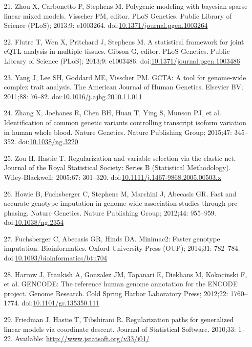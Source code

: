 \documentclass[]{article}
\begin{document}
21. Zhou X, Carbonetto P, Stephens M. Polygenic modeling with bayesian
sparse linear mixed models. Visscher PM, editor. PLoS Genetics. Public
Library of Science (PLoS); 2013;9: e1003264.
doi:\href{http://dx.doi.org/10.1371/journal.pgen.1003264}{10.1371/journal.pgen.1003264}

22. Flutre T, Wen X, Pritchard J, Stephens M. A statistical framework
for joint eQTL analysis in multiple tissues. Gibson G, editor. PLoS
Genetics. Public Library of Science (PLoS); 2013;9: e1003486.
doi:\href{http://dx.doi.org/10.1371/journal.pgen.1003486}{10.1371/journal.pgen.1003486}

23. Yang J, Lee SH, Goddard ME, Visscher PM. GCTA: A tool for
genome-wide complex trait analysis. The American Journal of Human
Genetics. Elsevier BV; 2011;88: 76--82.
doi:\href{http://dx.doi.org/10.1016/j.ajhg.2010.11.011}{10.1016/j.ajhg.2010.11.011}

24. Zhang X, Joehanes R, Chen BH, Huan T, Ying S, Munson PJ, et al.
Identification of common genetic variants controlling transcript isoform
variation in human whole blood. Nature Genetics. Nature Publishing
Group; 2015;47: 345--352.
doi:\href{http://dx.doi.org/10.1038/ng.3220}{10.1038/ng.3220}

25. Zou H, Hastie T. Regularization and variable selection via the
elastic net. Journal of the Royal Statistical Society: Series B
(Statistical Methodology). Wiley-Blackwell; 2005;67: 301--320.
doi:\href{http://dx.doi.org/10.1111/j.1467-9868.2005.00503.x}{10.1111/j.1467-9868.2005.00503.x}

26. Howie B, Fuchsberger C, Stephens M, Marchini J, Abecasis GR. Fast
and accurate genotype imputation in genome-wide association studies
through pre-phasing. Nature Genetics. Nature Publishing Group; 2012;44:
955--959. doi:\href{http://dx.doi.org/10.1038/ng.2354}{10.1038/ng.2354}

27. Fuchsberger C, Abecasis GR, Hinds DA. Minimac2: Faster genotype
imputation. Bioinformatics. Oxford University Press (OUP); 2014;31:
782--784.
doi:\href{http://dx.doi.org/10.1093/bioinformatics/btu704}{10.1093/bioinformatics/btu704}

28. Harrow J, Frankish A, Gonzalez JM, Tapanari E, Diekhans M,
Kokocinski F, et al. GENCODE: The reference human genome annotation for
the ENCODE project. Genome Research. Cold Spring Harbor Laboratory
Press; 2012;22: 1760--1774.
doi:\href{http://dx.doi.org/10.1101/gr.135350.111}{10.1101/gr.135350.111}

29. Friedman J, Hastie T, Tibshirani R. Regularization paths for
generalized linear models via coordinate descent. Journal of Statistical
Software. 2010;33: 1--22. Available:
\url{http://www.jstatsoft.org/v33/i01/}
\end{document}
